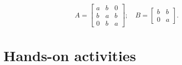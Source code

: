 \begin{equation}
A = \left[\begin{matrix}a & b & 0\\b & a & b\\0 & b & a\end{matrix}\right]; \quad
B = \left[\begin{matrix}b & b\\0 & a\end{matrix}\right].
\end{equation}

\hypertarget{hands-on-activities}{%
\section{Hands-on activities}\label{hands-on-activities}}

